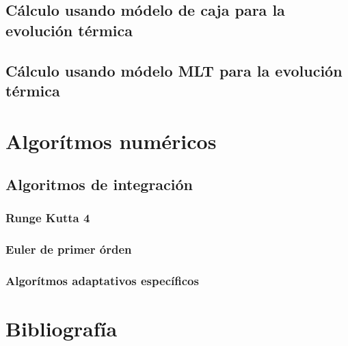 \documentclass[10pt]{book}
\begin{document}
	\section{Cálculo usando módelo de caja para la evolución térmica}
	\section{Cálculo usando módelo MLT para la evolución térmica}

\chapter{Algorítmos numéricos}
	\section{Algoritmos de integración}
		\subsection{Runge Kutta 4}
		\subsection{Euler de primer órden}
		\subsection{Algorítmos adaptativos específicos}
	
\chapter{Bibliografía}
\end{document}
